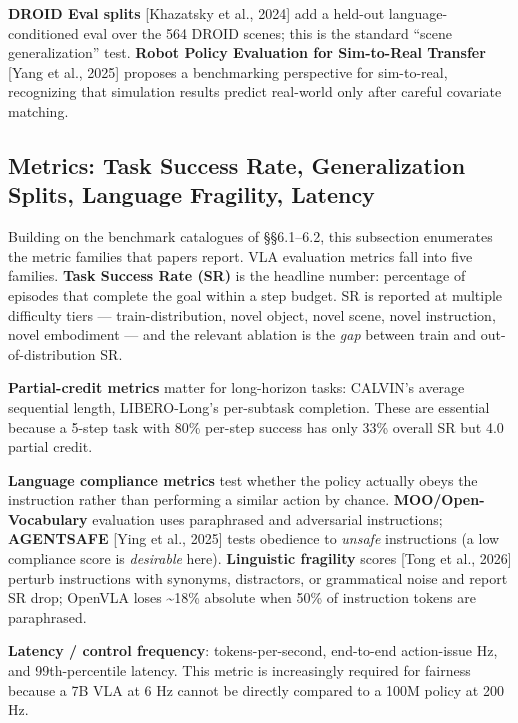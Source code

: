 \textbf{DROID Eval splits} {[}Khazatsky et al., 2024{]} add a held-out language-conditioned eval over the 564 DROID scenes; this is the standard ``scene generalization'' test. \textbf{Robot Policy Evaluation for Sim-to-Real Transfer} {[}Yang et al., 2025{]} proposes a benchmarking perspective for sim-to-real, recognizing that simulation results predict real-world only after careful covariate matching.

\subsection{Metrics: Task Success Rate, Generalization Splits, Language Fragility, Latency}\label{metrics-task-success-rate-generalization-splits-language-fragility-latency}

Building on the benchmark catalogues of §§6.1--6.2, this subsection enumerates the metric families that papers report. VLA evaluation metrics fall into five families. \textbf{Task Success Rate (SR)} is the headline number: percentage of episodes that complete the goal within a step budget. SR is reported at multiple difficulty tiers --- train-distribution, novel object, novel scene, novel instruction, novel embodiment --- and the relevant ablation is the \emph{gap} between train and out-of-distribution SR.

\textbf{Partial-credit metrics} matter for long-horizon tasks: CALVIN's average sequential length, LIBERO-Long's per-subtask completion. These are essential because a 5-step task with 80\% per-step success has only 33\% overall SR but 4.0 partial credit.

\textbf{Language compliance metrics} test whether the policy actually obeys the instruction rather than performing a similar action by chance. \textbf{MOO/Open-Vocabulary} evaluation uses paraphrased and adversarial instructions; \textbf{AGENTSAFE} {[}Ying et al., 2025{]} tests obedience to \emph{unsafe} instructions (a low compliance score is \emph{desirable} here). \textbf{Linguistic fragility} scores {[}Tong et al., 2026{]} perturb instructions with synonyms, distractors, or grammatical noise and report SR drop; OpenVLA loses \textasciitilde18\% absolute when 50\% of instruction tokens are paraphrased.

\textbf{Latency / control frequency}: tokens-per-second, end-to-end action-issue Hz, and 99th-percentile latency. This metric is increasingly required for fairness because a 7B VLA at 6 Hz cannot be directly compared to a 100M policy at 200 Hz.

